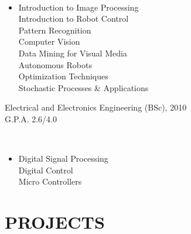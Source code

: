 \documentclass[margin]{res}
\begin{document}
\begin{resume}
		\hspace{.08in}{\bf Subjects}\vspace{-.15in}\\
		\begin{itemize}
			\item[] Introduction to Image Processing \\
			Introduction to Robot Control\\
			Pattern Recognition \\
			Computer Vision \\
			Data Mining for Visual Media \\
			Autonomous Robots \\
			Optimization Techniques \\
			Stochastic Processes \& Applications
		\end{itemize}
		
		{Electrical and Electronics Engineering (BSc), 2010\\G.P.A. 2.6/4.0}

		\hspace{.08in}{\bf Subjects}\vspace{-.15in}\\
		\begin{itemize}
			\item[] Digital Signal Processing \\
			Digital Control \\
			Micro Controllers
		\end{itemize}

		\section{PROJECTS}

\end{resume}
\end{document}
